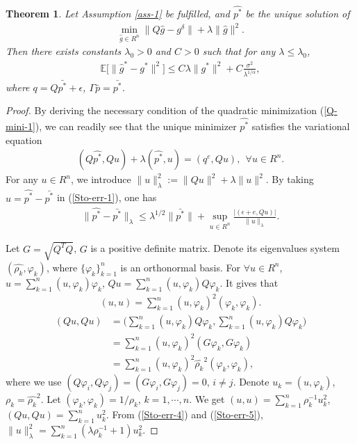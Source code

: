\documentclass[11pt]{article}
\newtheorem{theorem}{Theorem}[section]
\numberwithin{equation}{section}
\begin{document}
\begin{theorem}\label{Th-sto-1}
Let Assumption \ref{ass-1} be fulfilled, and $\hat{p^*}$ be the unique solution of 
\begin{align}\label{Q-mini-1}
\min\limits_{\hat{g}\in R^n} \|Q\hat{g}-g^\delta\| + \lambda\|\hat{g}\|^2.
\end{align}
Then there exists constants $\lambda_0>0$ and $C>0$ such that for any $\lambda\leq\lambda_0$,
\begin{align*}
\mathbb{E}\big[\|\hat{g}^*-g^*\|^2\big]\leq C\lambda\|g^*\|^2+C\frac{\sigma^2}{\lambda^{1/\alpha}},
\end{align*}
where $q=Q\bar{p^*}+\epsilon$, $\Gamma\bar{p}=\bar{p^*}$.
\end{theorem}
\begin{proof} 
By deriving the necessary condition of the quadratic minimization (\ref{Q-mini-1}), we can readily see that the unique minimizer $\hat{p^*}$ satisfies the
variational equation
\begin{align}\label{Sto-err-1}
(Q\hat{p^*},Qu)+\lambda(\hat{p^*},u)=(q^e,Qu),~~\forall u\in R^n.
\end{align}
For any $u\in R^n$, we introduce $\| u \|_{\lambda}^2:=\|Qu\|^2+\lambda\|u\|^2$. By taking $u=\hat{p^*}-\bar{p^*}$ in (\ref{Sto-err-1}), one has
\begin{align}\label{Sto-err-3}
\| \hat{p^*}-\bar{p^*}\|_{\lambda}\leq \lambda^{1/2}\|\bar{p^*}\|+\sup\limits_{u\in R^n}\frac{|(\epsilon+e,Qu)|}{\| u \|_{\lambda}}.
\end{align}

Let $G=\sqrt{Q^TQ}$, $G$ is a positive definite matrix. Denote its eigenvalues system $(\hat{\rho_k},\varphi_k)$, where $\{\varphi_k\}_{k=1}^n$ is an orthonormal basis.
For $\forall u\in R^n$, $u=\sum_{k=1}^n(u,\varphi_k)\varphi_k$, $Qu=\sum_{k=1}^n(u,\varphi_k)Q\varphi_k$. It gives that
\begin{align}\label{Sto-err-4}
(u,u)=\sum_{k=1}^n(u,\varphi_k)^2(\varphi_k,\varphi_k).
\end{align}
\begin{align}\label{Sto-err-5}
(Qu,Qu)
&=\bigg(\sum_{k=1}^n(u,\varphi_k)Q\varphi_k,\sum_{k=1}^n(u,\varphi_k)Q\varphi_k\bigg)\\ \nonumber
&=\sum_{k=1}^n(u,\varphi_k)^2(G\varphi_k,G\varphi_k)\\ \nonumber
&=\sum_{k=1}^n(u,\varphi_k)^2\hat{\rho_k}^2(\varphi_k,\varphi_k),
\end{align}
where we use $(Q\varphi_i,Q\varphi_j)=(G\varphi_i,G\varphi_j)=0$, $i\neq j$. Denote 
$u_k=(u,\varphi_k)$, $\rho_k=\hat{\rho_k}^2$. Let $(\varphi_k,\varphi_k)=1/\rho_k$, $k=1,\cdots,n$. We get $(u,u)=\sum_{k=1}^n\rho_k^{-1}u_k^2$, $(Qu,Qu)=\sum_{k=1}^nu_k^2$.
From (\ref{Sto-err-4}) and (\ref{Sto-err-5}), $\| u\|_{\lambda}^2=\sum_{k=1}^n(\lambda\rho_k^{-1}+1)u_k^2$.


\end{proof}
\end{document}
